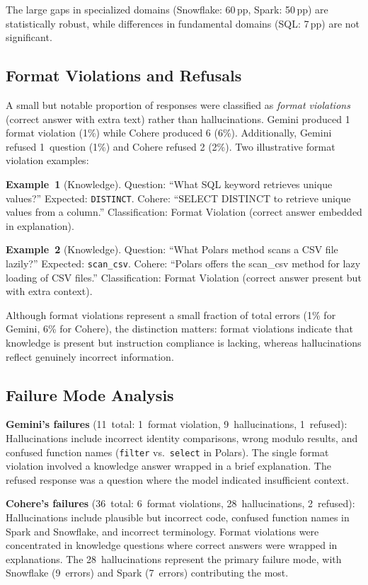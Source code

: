 \documentclass[conference]{IEEEtran}
\begin{document}
The large gaps in specialized domains (Snowflake: 60\,pp, Spark: 50\,pp) are statistically robust, while differences in fundamental domains (SQL: 7\,pp) are not significant.

\subsection{Format Violations and Refusals}

A small but notable proportion of responses were classified as \emph{format violations} (correct answer with extra text) rather than hallucinations. Gemini produced 1 format violation (1\%) while Cohere produced 6 (6\%). Additionally, Gemini refused 1~question (1\%) and Cohere refused 2 (2\%). Two illustrative format violation examples:

\textbf{Example~1} (Knowledge). Question: ``What SQL keyword retrieves unique values?'' Expected: \texttt{DISTINCT}. Cohere: ``SELECT DISTINCT to retrieve unique values from a column.'' Classification: Format Violation (correct answer embedded in explanation).

\textbf{Example~2} (Knowledge). Question: ``What Polars method scans a CSV file lazily?'' Expected: \texttt{scan\_csv}. Cohere: ``Polars offers the scan\_csv method for lazy loading of CSV files.'' Classification: Format Violation (correct answer present but with extra context).

Although format violations represent a small fraction of total errors (1\% for Gemini, 6\% for Cohere), the distinction matters: format violations indicate that knowledge is present but instruction compliance is lacking, whereas hallucinations reflect genuinely incorrect information.

\subsection{Failure Mode Analysis}

\textbf{Gemini's failures} (11~total: 1~format violation, 9~hallucinations, 1~refused): Hallucinations include incorrect identity comparisons, wrong modulo results, and confused function names (\texttt{filter} vs.\ \texttt{select} in Polars). The single format violation involved a knowledge answer wrapped in a brief explanation. The refused response was a question where the model indicated insufficient context.

\textbf{Cohere's failures} (36~total: 6~format violations, 28~hallucinations, 2~refused): Hallucinations include plausible but incorrect code, confused function names in Spark and Snowflake, and incorrect terminology. Format violations were concentrated in knowledge questions where correct answers were wrapped in explanations. The 28~hallucinations represent the primary failure mode, with Snowflake (9~errors) and Spark (7~errors) contributing the most.
\end{document}
